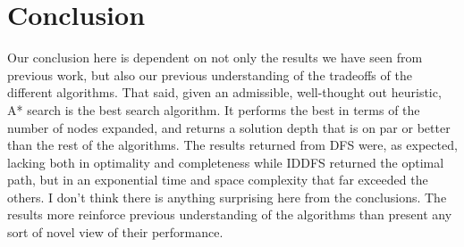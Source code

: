 \documentclass[journal]{IEEEtran}
\begin{document}
\section{Conclusion}
\noindent Our conclusion here is dependent on not only the results we have seen from previous
work, but also our previous understanding of the tradeoffs of the different algorithms. That said, given an
admissible, well-thought out heuristic, A* search is the best search algorithm. It
performs the best in terms of the number of nodes expanded, and returns a solution
depth that is on par or better than the rest of the algorithms. The results returned
from DFS were, as expected, lacking both in optimality and completeness while IDDFS
returned the optimal path, but in an exponential time and space complexity that far exceeded
the others. I don't think there is anything surprising here from the conclusions. The
results more reinforce previous understanding of the algorithms than present any sort of
novel view of their performance. \\
\end{document}
